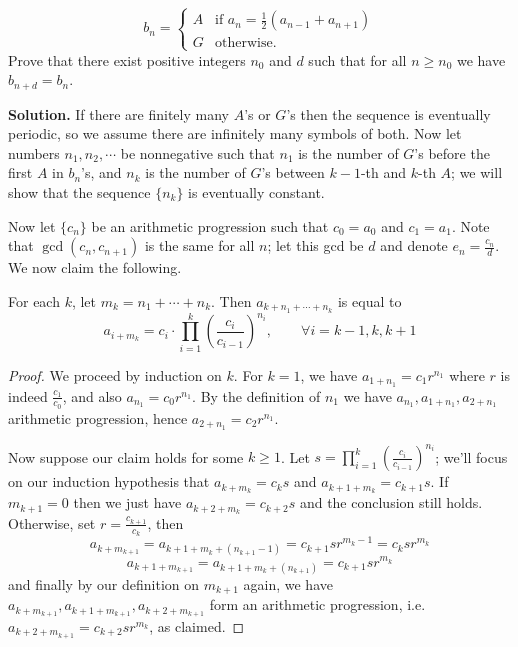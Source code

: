 \documentclass[11pt,a4paper]{article}
\begin{document}
\begin{enumerate}
		$$
		b_n = 
		\begin{cases}
			A & \text{if } a_n = \frac{1}{2}(a_{n-1} + a_{n+1}) \\
			G & \text{otherwise}.
		\end{cases}
		$$Prove that there exist positive integers $n_0$ and $d$ such that for all $n \ge n_0$ we have $b_{n+d} = b_n$.
		
		\textbf{Solution.} 
		If there are finitely many $A$'s or $G$'s then the sequence is eventually periodic, 
		so we assume there are infinitely many symbols of both. 
		Now let numbers $n_1, n_2, \cdots$ be nonnegative such that $n_1$ is the number of $G$'s before the first $A$ in $b_n$'s, and 
		$n_k$ is the number of $G$'s between $k-1$-th and $k$-th $A$; 
		we will show that the sequence $\{n_k\}$ is eventually constant. 
		
		Now let $\{c_n\}$ be an arithmetic progression such that $c_0=a_0$ and $c_1=a_1$. 
		Note that $\gcd(c_n, c_{n+1})$ is the same for all $n$; 
		let this gcd be $d$ and denote $e_n=\frac{c_n}{d}$. 
		We now claim the following. 
		\begin{lemma}
			For each $k$, let $m_k = n_1+\cdots + n_k$. 
			Then 
			$a_{k+n_1+\cdots + n_k}$ is equal to 
			\[
			a_{i+m_k} = 
			c_{i}\cdot \prod_{i=1}^k \left(\frac{c_i}{c_{i-1}}\right)^{n_i}, 
			\qquad 
			\forall i = k - 1, k, k + 1
			\]
		\end{lemma}
		\begin{proof}
			We proceed by induction on $k$. 
			For $k = 1$, 
			we have $a_{1 + n_1} = c_1 r^{n_1}$ where $r$ is indeed $\frac{c_1}{c_0}$, 
			and also $a_{n_1} = c_0 r^{n_1}$. 
			By the definition of $n_1$ we have 
			$a_{n_1}, a_{1+n_1}, a_{2+n_1}$ arithmetic progression, 
			hence 
			$a_{2+n_1}=c_2r^{n_1}$. 
			
			Now suppose our claim holds for some $k\ge 1$. 
			Let $s = \prod_{i=1}^k \left(\frac{c_i}{c_{i-1}}\right)^{n_i}$; 
			we'll focus on our induction hypothesis that 
			$a_{k+m_k} = c_ks$ and $a_{k+1+m_k}=c_{k+1}s$. 
			If $m_{k+1}=0$ then we just have 
			$a_{k+2+m_k}=c_{k+2}s$ and the conclusion still holds. 
			Otherwise, 
			set $r = \frac{c_{k+1}}{c_k}$, 
			then 
			\[a_{k+m_{k+1}} = a_{k+1+m_k+(n_{k+1}-1)} 
			= c_{k+1}sr^{m_k-1}
			=c_{k}sr^{m_k}
			\]
			\[a_{k+1+m_{k+1}} = a_{k+1+m_k+(n_{k+1})} 
			= c_{k+1}sr^{m_k}
			\]
			and finally by our definition on $m_{k+1}$ again, 
			we have $a_{k+m_{k+1}}, a_{k+1+m_{k+1}}, a_{k+2+m_{k+1}}$ form an arithmetic progression, 
			i.e. $a_{k+2+m_{k+1}} = c_{k+2}sr^{m_k}$, as claimed. 
		\end{proof}
		

\end{enumerate}
\end{document}
